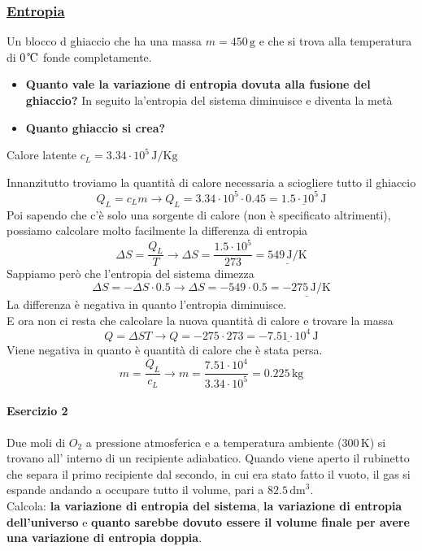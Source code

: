 \subsubsection*{\hyperref[subsec:termodinamica:entropia]{Entropia}}\label{ex:entropia}
Un blocco d ghiaccio che ha una massa $m = 450\,\text{g}$ e che si trova alla temperatura di 
$0\,\text{\textcelsius}$ fonde completamente.
\begin{itemize}
	\item \textbf{Quanto vale la variazione di entropia dovuta alla fusione del ghiaccio?} In seguito 
	la'entropia del sistema diminuisce e diventa la metà
	\item \textbf{Quanto ghiaccio si crea?}
\end{itemize}
Calore latente $c_L = 3.34\cdot10^5\,\text{J/Kg}$
\divisor

Innanzitutto troviamo la quantità di calore necessaria a sciogliere tutto il ghiaccio
\begin{equation*}
Q_L = c_Lm \rightarrow Q_L = 3.34\cdot10^5\cdot 0.45 = \underline{1.5\cdot10^5\,\text{J}}
\end{equation*}
Poi sapendo che c'è solo una sorgente di calore (non è specificato altrimenti), possiamo calcolare 
molto facilmente la differenza di entropia
\begin{equation*}
\Delta S = \frac{Q_L}{T} \rightarrow \Delta S = \frac{1.5\cdot10^5}{273} = \underline{549\,\text{J/K}}
\end{equation*}
Sappiamo però che l'entropia del sistema dimezza
\begin{equation*}
\Delta S = -\Delta S \cdot 0.5 \rightarrow \Delta S = -549 \cdot 0.5 = \underline{-275\,\text{J/K}}
\end{equation*}
La differenza è negativa in quanto l'entropia diminuisce.\\
E ora non ci resta che calcolare la nuova quantità di calore e trovare la massa
\begin{equation*}
Q = \Delta ST \rightarrow Q = -275\cdot273 = \underline{-7.51\cdot10^4\,\text{J}}
\end{equation*}
Viene negativa in quanto è quantità di calore che è stata persa.
\begin{equation*}
m = \frac{Q_L}{c_L} \rightarrow m = \frac{7.51\cdot10^4}{3.34\cdot10^5} = \boxed{0.225\,\text{kg}}
\end{equation*}

\paragraph{Esercizio 2}
Due moli di $O_2$ a pressione atmosferica e a temperatura ambiente ($300\,\text{K}$) si trovano all'
interno di un recipiente adiabatico. Quando viene aperto il rubinetto che separa il primo recipiente
dal secondo, in cui era stato fatto il vuoto, il gas si espande andando a occupare tutto il volume, 
pari a $82.5\,\text{dm}^3$.\\
Calcola: \textbf{la variazione di entropia del sistema}, \textbf{la variazione di entropia 
dell'universo} e \textbf{quanto sarebbe dovuto essere il volume finale per avere una variazione di
entropia doppia}.
\divisor

